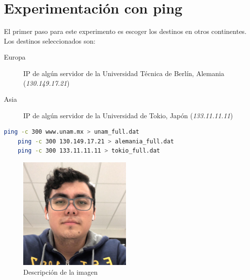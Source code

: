 \section*{Experimentación con ping}

El primer paso para este experimento es escoger los destinos en otros continentes. Los destinos seleccionados son:

\begin{description}
	\item[Europa] IP de algún servidor de la Universidad Técnica de Berlín, Alemania (\emph{130.149.17.21})
	\item[Asia] IP de algún servidor de la Universidad de Tokio, Japón (\emph{133.11.11.11})
\end{description}

\begin{lstlisting}[language=Bash, caption=Pings con 300 muestras guardando la salida, label=lst:pings]
	ping -c 300 www.unam.mx > unam_full.dat
	ping -c 300 130.149.17.21 > alemania_full.dat
	ping -c 300 133.11.11.11 > tokio_full.dat
\end{lstlisting}



\begin{figure}[H]
	\centering
	\includegraphics[width=0.5\textwidth]{img/foto}
	\caption{Descripción de la imagen}
	\label{fig:etiqueta_imagen}
\end{figure}